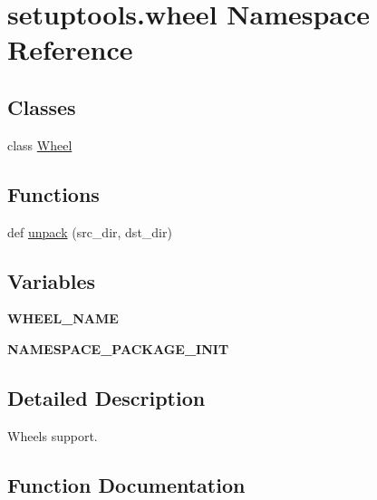 \hypertarget{namespacesetuptools_1_1wheel}{}\section{setuptools.\+wheel Namespace Reference}
\label{namespacesetuptools_1_1wheel}
\subsection*{Classes}
\begin{DoxyCompactItemize}
\item 
class \hyperlink{classsetuptools_1_1wheel_1_1_wheel}{Wheel}
\end{DoxyCompactItemize}
\subsection*{Functions}
\begin{DoxyCompactItemize}
\item 
def \hyperlink{namespacesetuptools_1_1wheel_ad6c9d6d0747d13b18934c45872e07ac8}{unpack} (src\+\_\+dir, dst\+\_\+dir)
\end{DoxyCompactItemize}
\subsection*{Variables}
\begin{DoxyCompactItemize}
\item 
\mbox{\label{namespacesetuptools_1_1wheel_a9843ec59778fbca1fd66dcd7f8773cc9}} 
{\bfseries W\+H\+E\+E\+L\+\_\+\+N\+A\+ME}
\item 
\mbox{\label{namespacesetuptools_1_1wheel_af1bf3e47ff942b2f0bd00d92907bb602}} 
{\bfseries N\+A\+M\+E\+S\+P\+A\+C\+E\+\_\+\+P\+A\+C\+K\+A\+G\+E\+\_\+\+I\+N\+IT}
\end{DoxyCompactItemize}


\subsection{Detailed Description}
\begin{DoxyVerb}Wheels support.\end{DoxyVerb}
 

\subsection{Function Documentation}
\mbox{\label{namespacesetuptools_1_1wheel_ad6c9d6d0747d13b18934c45872e07ac8}} 
